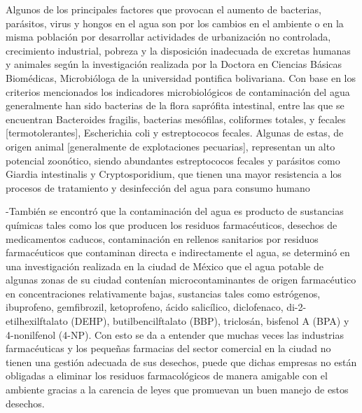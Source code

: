 Algunos de los principales factores que provocan el aumento de bacterias, parásitos, virus y hongos en el agua son por los cambios en el ambiente o en la misma población por desarrollar actividades de urbanización no controlada, crecimiento industrial, pobreza y la disposición inadecuada de excretas humanas y animales según la investigación realizada por la Doctora en Ciencias Básicas Biomédicas, Microbióloga de la universidad pontifica bolivariana. Con base en los criterios mencionados los indicadores microbiológicos de  contaminación del agua generalmente han sido bacterias de la flora saprófita intestinal, entre las que se encuentran Bacteroides fragilis, bacterias mesófilas, coliformes totales, y fecales [termotolerantes], Escherichia coli y estreptococos fecales. Algunas de estas, de origen animal [generalmente de explotaciones pecuarias], representan un alto potencial zoonótico, siendo abundantes estreptococos fecales y parásitos como Giardia intestinalis y Cryptosporidium, que tienen una mayor resistencia a los procesos de tratamiento y desinfección del agua para consumo humano

-También se encontró que la contaminación del agua es producto de sustancias químicas tales como los que producen los residuos farmacéuticos, desechos de medicamentos caducos, contaminación en rellenos sanitarios por residuos farmacéuticos que contaminan directa e indirectamente el agua, se determinó en una investigación realizada en la ciudad de México que el agua potable de algunas zonas de su ciudad contenían microcontaminantes de origen farmacéutico en concentraciones relativamente bajas, sustancias tales como estrógenos, ibuprofeno, gemfibrozil, ketoprofeno, ácido salicílico, diclofenaco, di-2-etilhexilftalato (DEHP), butilbencilftalato (BBP), triclosán, bisfenol A (BPA) y 4-nonilfenol (4-NP). Con esto se da a entender que muchas veces las industrias farmacéuticas y los pequeñas farmacias del sector comercial en la ciudad no tienen una gestión adecuada de sus desechos, puede que dichas empresas no están obligadas a eliminar los residuos farmacológicos de manera amigable con el ambiente gracias a la carencia de leyes que promuevan un buen manejo de estos desechos.

